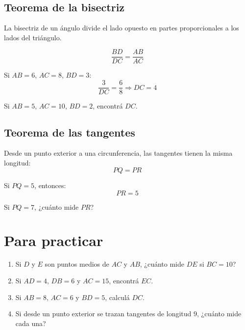 \documentclass[12pt]{article}
\begin{document}
    \subsection*{Teorema de la bisectriz}

    \begin{idea}
        La bisectriz de un ángulo divide el lado opuesto en partes proporcionales a los lados del triángulo.
    \end{idea}

    \begin{ejemplo}
        \[
        \frac{BD}{DC} = \frac{AB}{AC}
        \]

        Si $AB = 6$, $AC = 8$, $BD = 3$:
        \[
        \frac{3}{DC} = \frac{6}{8} \Rightarrow DC = 4
        \]
    \end{ejemplo}

    \begin{desafio}
        Si $AB = 5$, $AC = 10$, $BD = 2$, encontrá $DC$.
    \end{desafio}


    \subsection*{Teorema de las tangentes}

    \begin{idea}
        Desde un punto exterior a una circunferencia, las tangentes tienen la misma longitud:
        \[
        PQ = PR
        \]
    \end{idea}

    \begin{ejemplo}
        Si $PQ = 5$, entonces:
        \[
        PR = 5
        \]
    \end{ejemplo}

    \begin{desafio}
        Si $PQ = 7$, ¿cuánto mide $PR$?
    \end{desafio}

    \section{Para practicar}

    \begin{desafio}
        \begin{enumerate}
            \item Si $D$ y $E$ son puntos medios de $AC$ y $AB$, ¿cuánto mide $DE$ si $BC = 10$?

            \item Si $AD = 4$, $DB = 6$ y $AC = 15$, encontrá $EC$.

            \item Si $AB = 8$, $AC = 6$ y $BD = 5$, calculá $DC$.

            \item Si desde un punto exterior se trazan tangentes de longitud $9$, ¿cuánto mide cada una?
        \end{enumerate}
    \end{desafio}
\end{document}
